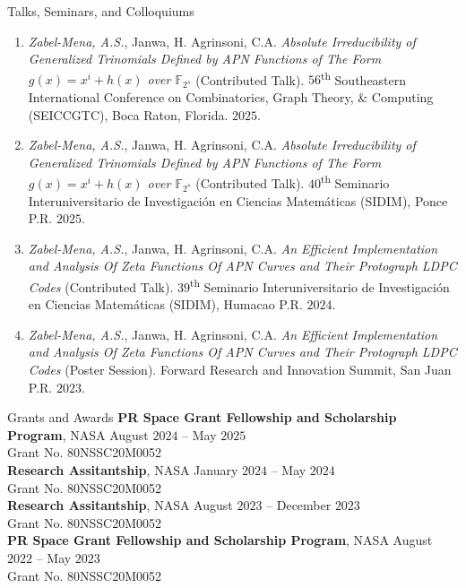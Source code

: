 \documentclass{resume}
\begin{document}
\begin{rSection}{Talks, Seminars, and Colloquiums}
  \begin{enumerate}
    \item \textit{Zabel-Mena, A.S.}, Janwa, H. Agrinsoni, C.A.
      \textit{Absolute Irreducibility of Generalized
        Trinomials Defined by APN Functions of The Form
      $g(x)=x^{i}+h(x)$ over $\mathbb{F}_{2^s}$} (Contributed Talk).
      $56$\textsuperscript{th} Southeastern International Conference
      on Combinatorics, Graph Theory, \& Computing (SEICCGTC), Boca
      Raton, Florida. $2025$.

    \item \textit{Zabel-Mena, A.S.}, Janwa, H. Agrinsoni, C.A.
      \textit{Absolute Irreducibility of Generalized
        Trinomials Defined by APN Functions of The Form
      $g(x)=x^{i}+h(x)$ over $\mathbb{F}_{2^s}$} (Contributed Talk).
      $40$\textsuperscript{th} Seminario Interuniversitario de
      Investigaci\'on en Ciencias Matem\'aticas (SIDIM), Ponce P.R.
      $2025$.

    \item \textit{Zabel-Mena, A.S.}, Janwa, H. Agrinsoni, C.A.
      \textit{An Efficient Implementation and Analysis Of Zeta
      Functions Of APN Curves and Their Protograph LDPC Codes}
      (Contributed Talk). $39$\textsuperscript{th} Seminario
      Interuniversitario de Investigaci\'on en Ciencias Matem\'aticas
      (SIDIM), Humacao P.R. $2024$.

    \item \textit{Zabel-Mena, A.S.}, Janwa, H. Agrinsoni, C.A.
      \textit{An Efficient Implementation and Analysis Of Zeta
      Functions Of APN Curves and Their Protograph LDPC Codes}
      (Poster Session). Forward Research and Innovation Summit, San
      Juan P.R. $2023$.
  \end{enumerate}
\end{rSection}

\begin{rSection}{Grants and Awards}
  \textbf{PR Space Grant Fellowship and Scholarship Program}, NASA
  \hfill{August $2024$ -- May $2025$} \\
  Grant No. 80NSSC20M0052 \\

  \textbf{Research Assitantship}, NASA
  \hfill{January $2024$ -- May $2024$} \\
  Grant No. 80NSSC20M0052 \\

  \textbf{Research Assitantship}, NASA
  \hfill{August $2023$ -- December $2023$} \\
  Grant No. 80NSSC20M0052 \\

  \textbf{PR Space Grant Fellowship and Scholarship Program}, NASA
  \hfill{August $2022$ -- May $2023$} \\
  Grant No. 80NSSC20M0052 \\
\end{rSection}
\end{document}

